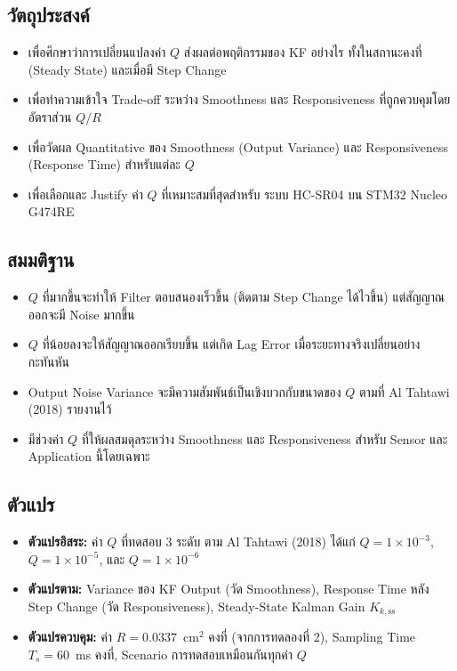 \subsection{วัตถุประสงค์}

\begin{itemize}
    \item เพื่อศึกษาว่าการเปลี่ยนแปลงค่า $Q$ ส่งผลต่อพฤติกรรมของ KF อย่างไร
          ทั้งในสถานะคงที่ (Steady State) และเมื่อมี Step Change
    \item เพื่อทำความเข้าใจ Trade-off ระหว่าง Smoothness และ Responsiveness
          ที่ถูกควบคุมโดยอัตราส่วน $Q/R$
    \item เพื่อวัดผล Quantitative ของ Smoothness (Output Variance)
          และ Responsiveness (Response Time) สำหรับแต่ละ $Q$
    \item เพื่อเลือกและ Justify ค่า $Q$ ที่เหมาะสมที่สุดสำหรับ
          ระบบ HC-SR04 บน STM32 Nucleo G474RE
\end{itemize}

\subsection{สมมติฐาน}

\begin{itemize}
    \item $Q$ ที่มากขึ้นจะทำให้ Filter ตอบสนองเร็วขึ้น
          (ติดตาม Step Change ได้ไวขึ้น) แต่สัญญาณออกจะมี Noise มากขึ้น
    \item $Q$ ที่น้อยลงจะให้สัญญาณออกเรียบขึ้น
          แต่เกิด Lag Error เมื่อระยะทางจริงเปลี่ยนอย่างกะทันหัน
    \item Output Noise Variance จะมีความสัมพันธ์เป็นเชิงบวกกับขนาดของ $Q$
          ตามที่ Al Tahtawi (2018) รายงานไว้
    \item มีช่วงค่า $Q$ ที่ให้ผลสมดุลระหว่าง Smoothness และ Responsiveness
          สำหรับ Sensor และ Application นี้โดยเฉพาะ
\end{itemize}

\subsection{ตัวแปร}

\begin{itemize}
    \item \textbf{ตัวแปรอิสระ:} ค่า $Q$ ที่ทดสอบ 3 ระดับ
          ตาม Al Tahtawi (2018) ได้แก่
          $Q = 1\times10^{-3}$, $Q = 1\times10^{-5}$, และ $Q = 1\times10^{-6}$
    \item \textbf{ตัวแปรตาม:} Variance ของ KF Output (วัด Smoothness),
          Response Time หลัง Step Change (วัด Responsiveness),
          Steady-State Kalman Gain $K_{k,\mathrm{ss}}$
    \item \textbf{ตัวแปรควบคุม:} ค่า $R = 0.0337$~cm$^2$ คงที่
          (จากการทดลองที่ 2), Sampling Time $T_s = 60$~ms คงที่,
          Scenario การทดสอบเหมือนกันทุกค่า $Q$
\end{itemize}

